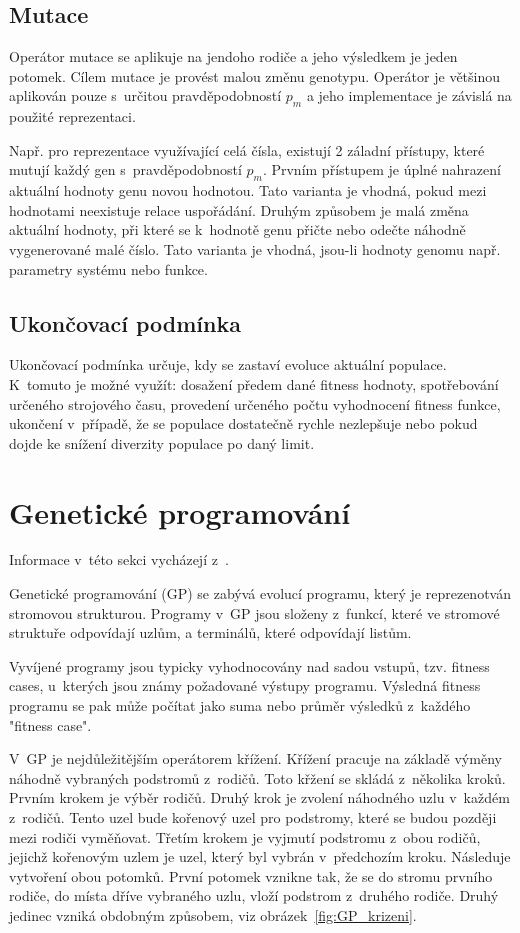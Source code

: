 \subsection{Mutace}
Operátor mutace se aplikuje na jendoho rodiče a jeho výsledkem je jeden potomek.
Cílem mutace je provést malou změnu genotypu.
Operátor je většinou aplikován pouze s~určitou pravděpodobností $p_m$ a jeho implementace je závislá na použité reprezentaci.


Např. pro reprezentace využívající celá čísla, existují 2 záladní přístupy, které mutují každý gen s~pravděpodobností $p_m$.
Prvním přístupem je úplné nahrazení aktuální hodnoty genu novou hodnotou.
Tato varianta je vhodná, pokud mezi hodnotami neexistuje relace uspořádání.
Druhým způsobem je malá změna aktuální hodnoty, při které se k~hodnotě genu přičte nebo odečte náhodně vygenerované malé číslo.
Tato varianta je vhodná, jsou-li hodnoty genomu např. parametry systému nebo funkce.

\subsection{Ukončovací podmínka}
Ukončovací podmínka určuje, kdy se zastaví evoluce aktuální populace.
K~tomuto je možné využít: dosažení předem dané fitness hodnoty, spotřebování určeného strojového času, provedení určeného počtu vyhodnocení fitness funkce, ukončení v~případě, že se populace dostatečně rychle nezlepšuje nebo pokud dojde ke snížení diverzity populace po daný limit.

\section{Genetické programování}
\label{sec:gp}

Informace v~této sekci vycházejí z~\cite{Koza1992}.

Genetické programování (GP) se zabývá evolucí programu, který je reprezenotván stromovou strukturou.
Programy v~GP jsou složeny z~funkcí, které ve stromové struktuře odpovídají uzlům, a terminálů, které odpovídají listům.

Vyvíjené programy jsou typicky vyhodnocovány nad sadou vstupů, tzv. fitness cases, u~kterých jsou známy požadované výstupy programu.
Výsledná fitness programu se pak může počítat jako suma nebo průměr výsledků z~každého "fitness case".

V~GP je nejdůležitějším operátorem křížení.
Křížení pracuje na základě výměny náhodně vybraných podstromů z~rodičů.
Toto křžení se skládá z~několika kroků.
Prvním krokem je výběr rodičů.
Druhý krok je zvolení náhodného uzlu v~každém z~rodičů.
Tento uzel bude kořenový uzel pro podstromy, které se budou později mezi rodiči vyměňovat.
Třetím krokem je vyjmutí podstromu z~obou rodičů, jejichž kořenovým uzlem je uzel, který byl vybrán v~předchozím kroku.
Následuje vytvoření obou potomků.
První potomek vznikne tak, že se do stromu prvního rodiče, do místa dříve vybraného uzlu, vloží podstrom z~druhého rodiče.
Druhý jedinec vzniká obdobným způsobem, viz obrázek~\ref{fig:GP_krizeni}.

